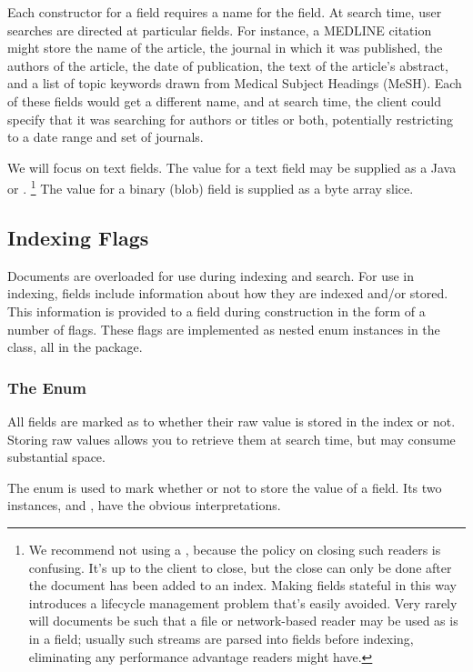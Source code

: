 Each constructor for a field requires a name for the field.  At search
time, user searches are directed at particular fields.  For instance,
a MEDLINE citation might store the name of the article, the journal in
which it was published, the authors of the article, the date of
publication, the text of the article's abstract, and a list of topic
keywords drawn from Medical Subject Headings (MeSH).  Each of these
fields would get a different name, and at search time, the client
could specify that it was searching for authors or titles or both,
potentially restricting to a date range and set of journals.

We will focus on text fields.  The value for a text field may be
supplied as a Java  or .%
%
\footnote{We recommend not using a , because the policy
  on closing such readers is confusing.  It's up to the client to
  close, but the close can only be done after the document has been
  added to an index.  Making fields stateful in this way introduces a
  lifecycle management problem that's easily avoided.  Very rarely
  will documents be such that a file or network-based reader may be
  used as is in a field; usually such streams are parsed into fields
  before indexing, eliminating any performance advantage readers might
  have.}
%
The value for a binary (blob) field is supplied as a byte array slice.


\subsection{Indexing Flags}

Documents are overloaded for use during indexing and search.  For use
in indexing, fields include information about how they are indexed
and/or stored.  This information is provided to a field during
construction in the form of a number of flags.  These flags are
implemented as nested enum instances in the  class,
all in the  package.

\subsubsection{The  Enum}

All fields are marked as to whether their raw value is stored in the
index or not.  Storing raw values allows you to retrieve them at
search time, but may consume substantial space.  

The enum  is used to mark whether or not to store
the value of a field.  Its two instances,  and
, have the obvious interpretations.

